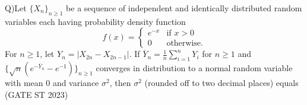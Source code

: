 \documentclass[journal,12pt,twocolumn]{IEEEtran}
\begin{document}
Q)Let $\{X_n\}_{n \geq 1}$ be a sequence of independent and identically distributed random variables each having probability density function
\[
f(x) = 
\begin{cases}
  e^{-x} & \text{if } x > 0 \\
  0 & \text{otherwise}.
\end{cases}
\]
For $n \geq 1$, let $Y_n = |X_{2n} - X_{2n-1}|$. If $\overline{Y}_n = \frac{1}{n} \sum_{i=1}^{n} Y_i$ for $n \geq 1$ and $\{\sqrt{n} (e^{-\overline{Y}_n} - e^{-1})\}_{n \geq 1}$ converges in distribution to a normal random variable with mean $0$ and variance $\sigma^2$, then $\sigma^2$ (rounded off to two decimal places) equals \hfill (GATE ST 2023) \\
   \fi
   \solution
\end{document}
